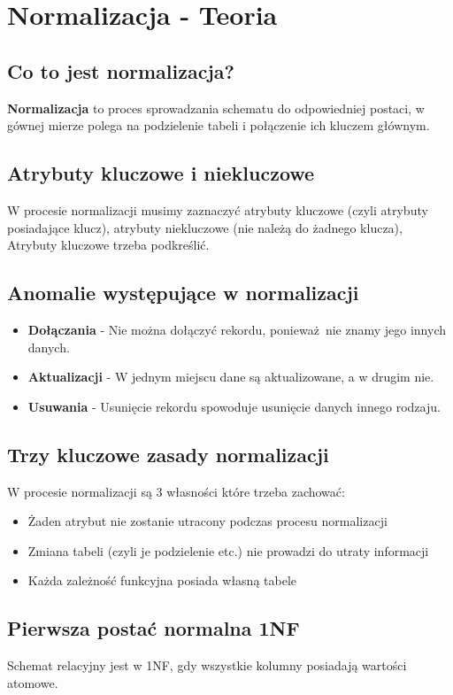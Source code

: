 \documentclass[12pt, a4paper]{article}
\begin{document}
\tableofcontents
\newpage
\section{Normalizacja - Teoria}
\subsection*{Co to jest normalizacja?}
\textbf{Normalizacja} to proces sprowadzania schematu do odpowiedniej postaci, w gównej mierze polega
na podzielenie tabeli i połączenie ich kluczem głównym.

\subsection*{Atrybuty kluczowe i niekluczowe}
W procesie normalizacji musimy zaznaczyć atrybuty kluczowe (czyli atrybuty posiadające klucz),
atrybuty niekluczowe (nie należą do żadnego klucza), Atrybuty kluczowe trzeba podkreślić.

\subsection*{Anomalie występujące w normalizacji}
\begin{itemize}
  \item \textbf{Dołączania} - Nie można dołączyć rekordu, ponieważ nie znamy jego innych danych.
  \item \textbf{Aktualizacji} - W jednym miejscu dane są aktualizowane, a w drugim nie.
  \item \textbf{Usuwania} - Usunięcie rekordu spowoduje usunięcie danych innego rodzaju.
\end{itemize}

\subsection*{Trzy kluczowe zasady normalizacji}
W procesie normalizacji są 3 własności które trzeba zachować:
\begin{itemize}
  \item Żaden atrybut nie zostanie utracony podczas procesu normalizacji
  \item Zmiana tabeli (czyli je podzielenie etc.) nie prowadzi do utraty informacji
  \item Każda zależność funkcyjna posiada własną tabele
\end{itemize}
\subsection*{Pierwsza postać normalna 1NF}
Schemat relacyjny jest w 1NF, gdy wszystkie kolumny posiadają wartości atomowe.
\end{document}
